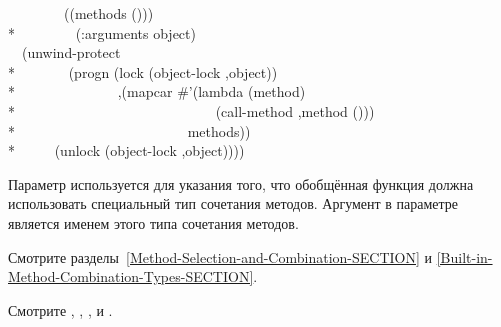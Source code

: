 \begin{defmac}
\begin{lisp}
~~~~~~~~((methods ())) \\*
~~~~~~~~(:arguments object) \\
~~{\Xbq}(unwind-protect \\*
~~~~~~~(progn (lock (object-lock ,object)) \\*
~~~~~~~~~~~~~~,{\Xatsign}(mapcar \#'(lambda (method) \\*
~~~~~~~~~~~~~~~~~~~~~~~~~~~~{\Xbq}(call-method ,method ())) \\*
~~~~~~~~~~~~~~~~~~~~~~~~methods)) \\*
~~~~~(unlock (object-lock ,object))))
\end{lisp}

Параметр   используется для указания
того, что обобщённая функция должна использовать специальный тип сочетания
методов. Аргумент в параметре  является именем этого
типа сочетания методов.

Смотрите разделы~\ref{Method-Selection-and-Combination-SECTION} и
\ref{Built-in-Method-Combination-Types-SECTION}.

Смотрите ,
,
,
и .
\end{defmac}

